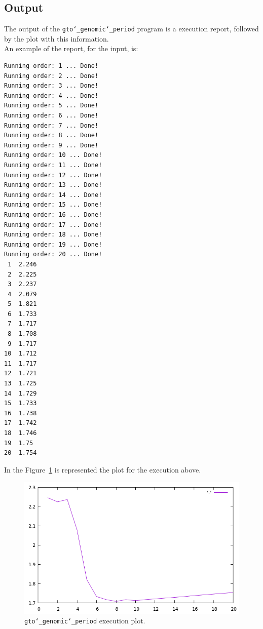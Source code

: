 \subsection*{Output}
The output of the \texttt{gto\char`_genomic\char`_period} program is a execution report, followed by the plot with this information.\\
An example of the report, for the input, is:
\begin{lstlisting}
Running order: 1 ... Done!
Running order: 2 ... Done!
Running order: 3 ... Done!
Running order: 4 ... Done!
Running order: 5 ... Done!
Running order: 6 ... Done!
Running order: 7 ... Done!
Running order: 8 ... Done!
Running order: 9 ... Done!
Running order: 10 ... Done!
Running order: 11 ... Done!
Running order: 12 ... Done!
Running order: 13 ... Done!
Running order: 14 ... Done!
Running order: 15 ... Done!
Running order: 16 ... Done!
Running order: 17 ... Done!
Running order: 18 ... Done!
Running order: 19 ... Done!
Running order: 20 ... Done!
 1	2.246
 2	2.225
 3	2.237
 4	2.079
 5	1.821
 6	1.733
 7	1.717
 8	1.708
 9	1.717
10	1.712
11	1.717
12	1.721
13	1.725
14	1.729
15	1.733
16	1.738
17	1.742
18	1.746
19	1.75
20	1.754
\end{lstlisting}

In the Figure~\ref{fig:gtoGenomicPeriod} is represented the plot for the execution above.

 \begin{figure}[!h]
  \centering
  \includegraphics[scale=0.7]{./images/gto_genomic_period.png}
  \caption{\texttt{gto\char`_genomic\char`_period} execution plot.}
  \label{fig:gtoGenomicPeriod}
 \end{figure}